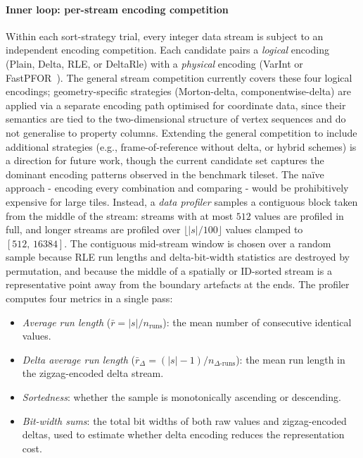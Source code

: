 \paragraph{Inner loop: per-stream encoding competition}\label{sub_stream_competition}
Within each sort-strategy trial, every integer data stream is subject to an independent encoding competition.
Each candidate pairs a \emph{logical} encoding (Plain, Delta, \ac{RLE}, or DeltaRle) with a \emph{physical} encoding (\ac{VarInt} or \ac{FastPFOR}~\cite{lemireDecodingBillionsIntegers2015}).
The general stream competition currently covers these four logical encodings; geometry-specific strategies (Morton-delta, componentwise-delta) are applied via a separate encoding path optimised for coordinate data, since their semantics are tied to the two-dimensional structure of vertex sequences and do not generalise to property columns.
Extending the general competition to include additional strategies (e.g., frame-of-reference without delta, or hybrid schemes) is a direction for future work, though the current candidate set captures the dominant encoding patterns observed in the benchmark tileset.
The na\"ive approach - encoding every combination and comparing - would be prohibitively expensive for large tiles.
Instead, a \emph{data profiler} samples a contiguous block taken from the middle of the stream: streams with at most $512$ values are profiled in full, and longer streams are profiled over $\lfloor |s| / 100 \rfloor$ values clamped to $[512,\, 16384]$.
The contiguous mid-stream window is chosen over a random sample because \ac{RLE} run lengths and delta-bit-width statistics are destroyed by permutation, and because the middle of a spatially or ID-sorted stream is a representative point away from the boundary artefacts at the ends.
The profiler computes four metrics in a single pass:

\begin{itemize}
    \item \emph{Average run length} ($\bar{r} = |s| / n_{\text{runs}}$): the mean number of consecutive identical values.
    \item \emph{Delta average run length} ($\bar{r}_\Delta = (|s|-1) / n_{\Delta\text{-runs}}$): the mean run length in the zigzag-encoded delta stream.
    \item \emph{Sortedness}: whether the sample is monotonically ascending or descending.
    \item \emph{Bit-width sums}: the total bit widths of both raw values and zigzag-encoded deltas, used to estimate whether delta encoding reduces the representation cost.
\end{itemize}

